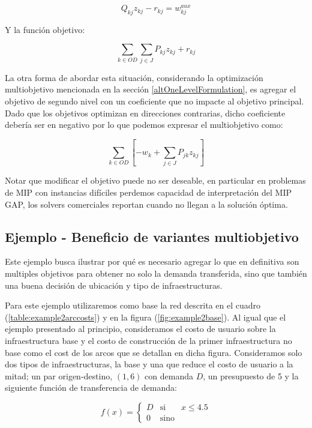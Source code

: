 \documentclass{article}
\begin{document}
  \begin{equation}
    Q_{kj} z_{kj} - r_{kj} = w^{aux}_{kj}
  \end{equation}

  Y la función objetivo:

  \begin{equation}
    \sum_{k \in OD} \sum_{j \in J} P_{kj}z_{kj} + r_{kj}
  \end{equation}

  La otra forma de abordar esta situación, considerando la optimización multiobjetivo mencionada en la sección \ref{altOneLevelFormulation}, es agregar el objetivo de segundo nivel con un coeficiente que no impacte al objetivo principal. Dado que los objetivos optimizan en direcciones contrarias, dicho coeficiente debería ser en negativo por lo que podemos expresar el multiobjetivo como:

  \begin{equation}
      \sum_{k \in OD} \left[ -w_k + \sum_{j \in J} P_{jk}z_{kj} \right]
  \end{equation}

  Notar que modificar el objetivo puede no ser deseable, en particular en problemas de MIP con instancias difíciles perdemos capacidad de interpretación del MIP GAP, los solvers comerciales reportan cuando no llegan a la solución óptima.

  \subsection{Ejemplo - Beneficio de variantes multiobjetivo}

  Este ejemplo busca ilustrar por qué es necesario agregar lo que en definitiva son multiples objetivos para obtener no solo la demanda transferida, sino que también una buena decisión de ubicación y tipo de infraestructuras.

  Para este ejemplo utilizaremos como base la red descrita en el cuadro (\ref{table:example2arccosts}) y en la figura (\ref{fig:example2base}). Al igual que el ejemplo presentado al principio, consideramos el costo de usuario sobre la infraestructura base y el costo de construcción de la primer infraestructura no base como el cost de los arcos que se detallan en dicha figura. Consideramos solo dos tipos de infraestructuras, la base y una que reduce el costo de usuario a la mitad; un par origen-destino, $(1, 6)$ con demanda $D$, un presupuesto de 5 y la siguiente función de transferencia de demanda:

  $$
    f(x) = \left\{ \begin{array}{lcr}
            D & \mbox{si}   & x \leq 4.5 \\
            0 & \mbox{sino} &
    \end{array}
    \right.
  $$
\end{document}
